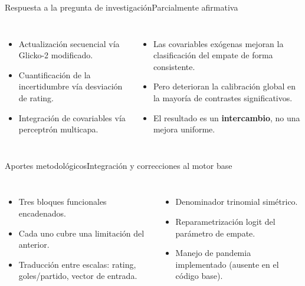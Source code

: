 \documentclass[aspectratio=169,11pt]{beamer}
\begin{document}
\begin{frame}{Respuesta a la pregunta de investigaci\'on}{Parcialmente afirmativa}
	\vspace*{-0.6cm}
	\begin{columns}[T,onlytextwidth]
		\par\vskip 2mm
		\footnotesize
		\begin{itemize}
			\item Actualizaci\'on secuencial v\'ia Glicko-2 modificado.
			\item Cuantificaci\'on de la incertidumbre v\'ia desviaci\'on de rating.
			\item Integraci\'on de covariables v\'ia perceptr\'on multicapa.
		\end{itemize}
		\par\vskip 2mm
		\footnotesize
		\begin{itemize}
			\item Las covariables ex\'ogenas mejoran la clasificaci\'on del empate de forma consistente.
			\item Pero deterioran la calibraci\'on global en la mayor\'ia de contrastes significativos.
			\item El resultado es un \textbf{intercambio}, no una mejora uniforme.
		\end{itemize}
	\end{columns}
	\vfill
\end{frame}

\begin{frame}{Aportes metodol\'ogicos}{Integraci\'on y correcciones al motor base}
	\begin{columns}[T,onlytextwidth]
		\par\vskip 2mm
		\footnotesize
		\begin{itemize}
			\item Tres bloques funcionales encadenados.
			\item Cada uno cubre una limitaci\'on del anterior.
			\item Traducci\'on entre escalas: rating, goles/partido, vector de entrada.
		\end{itemize}
		\par\vskip 2mm
		\footnotesize
		\begin{itemize}
			\item Denominador trinomial sim\'etrico.
			\item Reparametrizaci\'on logit del par\'ametro de empate.
			\item Manejo de pandemia implementado (ausente en el c\'odigo base).
		\end{itemize}
	\end{columns}
	\vfill
\end{frame}
\end{document}
